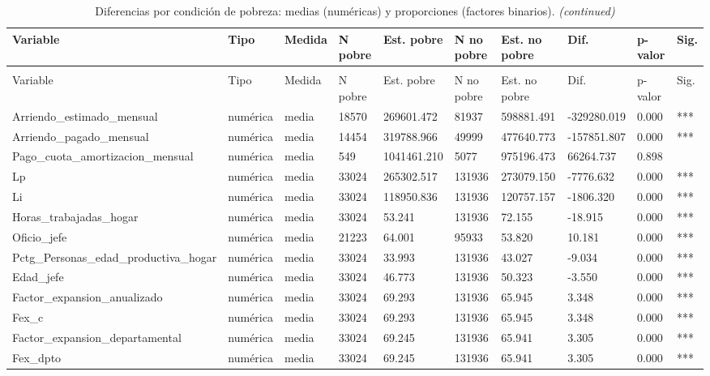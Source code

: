 
\begin{longtable}[t]{llllllllll}
\caption{\label{tab:tab:diff_mix_pobreza}Diferencias por condición de pobreza: medias (numéricas) y proporciones (factores binarios).}\\
\toprule
Variable & Tipo & Medida & N pobre & Est. pobre & N no pobre & Est. no pobre & Dif. & p-valor & Sig.\\
\midrule
\endfirsthead
\caption[]{Diferencias por condición de pobreza: medias (numéricas) y proporciones (factores binarios). \textit{(continued)}}\\
\toprule
Variable & Tipo & Medida & N pobre & Est. pobre & N no pobre & Est. no pobre & Dif. & p-valor & Sig.\\
\midrule
\endhead

\endfoot
\bottomrule
\endlastfoot
Arriendo\_estimado\_mensual & numérica & media & 18570 & 269601.472 & 81937 & 598881.491 & -329280.019 & 0.000 & ***\\
Arriendo\_pagado\_mensual & numérica & media & 14454 & 319788.966 & 49999 & 477640.773 & -157851.807 & 0.000 & ***\\
Pago\_cuota\_amortizacion\_mensual & numérica & media & 549 & 1041461.210 & 5077 & 975196.473 & 66264.737 & 0.898 & \\
Lp & numérica & media & 33024 & 265302.517 & 131936 & 273079.150 & -7776.632 & 0.000 & ***\\
Li & numérica & media & 33024 & 118950.836 & 131936 & 120757.157 & -1806.320 & 0.000 & ***\\
Horas\_trabajadas\_hogar & numérica & media & 33024 & 53.241 & 131936 & 72.155 & -18.915 & 0.000 & ***\\
Oficio\_jefe & numérica & media & 21223 & 64.001 & 95933 & 53.820 & 10.181 & 0.000 & ***\\
Pctg\_Personas\_edad\_productiva\_hogar & numérica & media & 33024 & 33.993 & 131936 & 43.027 & -9.034 & 0.000 & ***\\
Edad\_jefe & numérica & media & 33024 & 46.773 & 131936 & 50.323 & -3.550 & 0.000 & ***\\
Factor\_expansion\_anualizado & numérica & media & 33024 & 69.293 & 131936 & 65.945 & 3.348 & 0.000 & ***\\
Fex\_c & numérica & media & 33024 & 69.293 & 131936 & 65.945 & 3.348 & 0.000 & ***\\
Factor\_expansion\_departamental & numérica & media & 33024 & 69.245 & 131936 & 65.941 & 3.305 & 0.000 & ***\\
Fex\_dpto & numérica & media & 33024 & 69.245 & 131936 & 65.941 & 3.305 & 0.000 & ***\\

\end{longtable}
